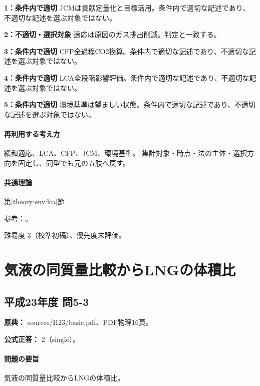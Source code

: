 \noindent\textbf{1：条件内で適切} JCMは貢献定量化と目標活用。条件内で適切な記述であり、不適切な記述を選ぶ対象ではない。\par

\noindent\textbf{2：不適切・選択対象} 適応は原因のガス排出削減。判定と一致する。\par

\noindent\textbf{3：条件内で適切} CFP全過程CO2換算。条件内で適切な記述であり、不適切な記述を選ぶ対象ではない。\par

\noindent\textbf{4：条件内で適切} LCA全段階影響評価。条件内で適切な記述であり、不適切な記述を選ぶ対象ではない。\par

\noindent\textbf{5：条件内で適切} 環境基準は望ましい状態。条件内で適切な記述であり、不適切な記述を選ぶ対象ではない。\par

\paragraph{再利用する考え方} 緩和適応、LCA、CFP、JCM、環境基準。 集計対象・時点・法の主体・選択方向を固定し、同型でも元の五肢へ戻す。

\paragraph{共通理論} \hyperref[theory:env:lca]{第\ref*{theory:env:lca}節}

\par 参考：\cite{env59_ndc,env58_pmstandard}。

\par 難易度 3（校準初稿）、優先度未評価。

\section{気液の同質量比較からLNGの体積比}

\subsection{平成23年度 問5-3}
\label{q:h23-reg-basic-5-3}

\noindent\textbf{原典：} sources/H23/basic.pdf、PDF物理16頁。

\textbf{公式正答：} 2（single）。

\paragraph{問題の要旨} 気液の同質量比較からLNGの体積比。

